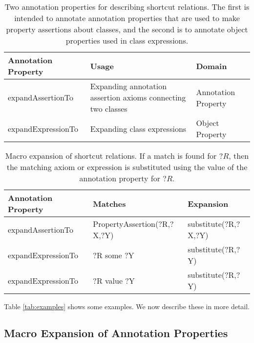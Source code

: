 \documentclass{llncs}
\begin{document}
  \begin{table}
    \begin{tabular}{ | p{3.5cm} | p{4.5cm} | p{4cm} | }
      \hline 
      \textbf{Annotation Property}  & \textbf{Usage} & \textbf{Domain} \\

      \hline
      expandAssertionTo  & Expanding annotation assertion axioms connecting two classes & Annotation Property \\

      \hline
      expandExpressionTo  & Expanding class expressions & Object Property \\

      \hline
    \end{tabular}
    \caption{Two annotation properties for describing shortcut
      relations. The first is intended to annotate annotation
      properties that are used to make property assertions about
      classes, and the second is to annotate object properties used in
      class expressions.}
    \label{tab:macro-defining-props}
  \end{table}

  \begin{table}
    \begin{tabular}{ | p{4cm} | p{5cm} | p{5cm} | }
      \hline 
      \textbf{Annotation Property} & \textbf{Matches} & \textbf{Expansion} \\

      \hline
      expandAssertionTo & PropertyAssertion(?R,?X,?Y) & substitute(?R,?X,?Y) \\

      \hline
      expandExpressionTo & ?R some ?Y & substitute(?R,?Y) \\

      \hline
      expandExpressionTo & ?R value ?Y & substitute(?R,?Y) \\

      \hline
    \end{tabular}
    \caption{Macro expansion of shortcut relations. If a match is
      found for $?R$, then the matching axiom or expression is
      substituted using the value of the annotation property for $?R$.}
    \label{tab:macro-expansion}
  \end{table}

Table \ref{tab:examples} shows some examples. We now describe these in more detail.

\subsection{Macro Expansion of Annotation Properties}
\end{document}
